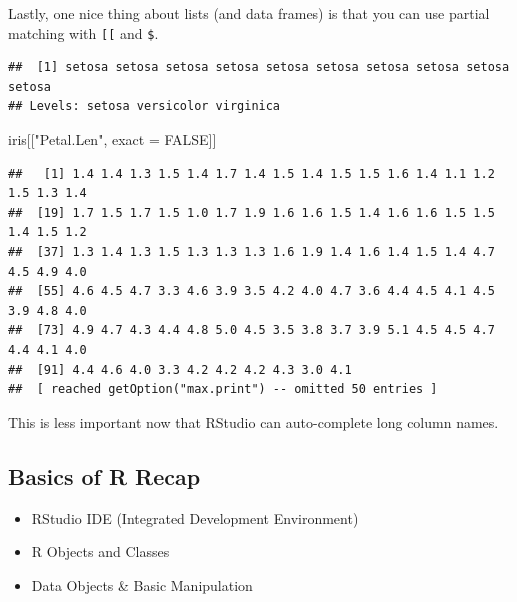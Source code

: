 \documentclass[
]{book}
\newenvironment{Shaded}{\begin{snugshade}}{\end{snugshade}}
\newcommand{\DecValTok}[1]{\textcolor[rgb]{0.00,0.00,0.81}{#1}}
\newcommand{\NormalTok}[1]{#1}
\newcommand{\OperatorTok}[1]{\textcolor[rgb]{0.81,0.36,0.00}{\textbf{#1}}}
\newcommand{\OtherTok}[1]{\textcolor[rgb]{0.56,0.35,0.01}{#1}}
\newcommand{\StringTok}[1]{\textcolor[rgb]{0.31,0.60,0.02}{#1}}
\theoremstyle{definition}
\theoremstyle{definition}
\theoremstyle{definition}
\theoremstyle{remark}
\begin{document}
Lastly, one nice thing about lists (and data frames) is that you can use partial matching with \texttt{{[}{[}} and \texttt{\$}.

\begin{Shaded}
\end{Shaded}

\begin{verbatim}
##  [1] setosa setosa setosa setosa setosa setosa setosa setosa setosa setosa
## Levels: setosa versicolor virginica
\end{verbatim}

\begin{Shaded}
\begin{Highlighting}[]
\NormalTok{iris[[}\StringTok{"Petal.Len"}\NormalTok{, exact =}\StringTok{ }\OtherTok{FALSE}\NormalTok{]]}
\end{Highlighting}
\end{Shaded}

\begin{verbatim}
##   [1] 1.4 1.4 1.3 1.5 1.4 1.7 1.4 1.5 1.4 1.5 1.5 1.6 1.4 1.1 1.2 1.5 1.3 1.4
##  [19] 1.7 1.5 1.7 1.5 1.0 1.7 1.9 1.6 1.6 1.5 1.4 1.6 1.6 1.5 1.5 1.4 1.5 1.2
##  [37] 1.3 1.4 1.3 1.5 1.3 1.3 1.3 1.6 1.9 1.4 1.6 1.4 1.5 1.4 4.7 4.5 4.9 4.0
##  [55] 4.6 4.5 4.7 3.3 4.6 3.9 3.5 4.2 4.0 4.7 3.6 4.4 4.5 4.1 4.5 3.9 4.8 4.0
##  [73] 4.9 4.7 4.3 4.4 4.8 5.0 4.5 3.5 3.8 3.7 3.9 5.1 4.5 4.5 4.7 4.4 4.1 4.0
##  [91] 4.4 4.6 4.0 3.3 4.2 4.2 4.2 4.3 3.0 4.1
##  [ reached getOption("max.print") -- omitted 50 entries ]
\end{verbatim}

This is less important now that RStudio can auto-complete long column names.

\hypertarget{basics-of-r-recap}{%
\subsection{Basics of R Recap}\label{basics-of-r-recap}}

\begin{itemize}
\item
  RStudio IDE (Integrated Development Environment)
\item
  R Objects and Classes
\item
  Data Objects \& Basic Manipulation
\end{itemize}
\end{document}

